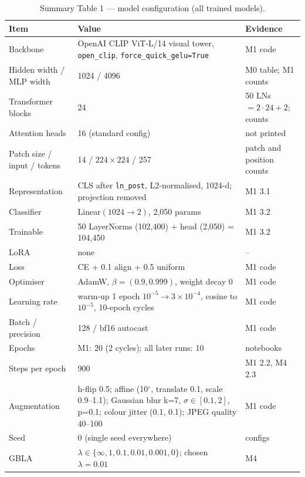 \documentclass[10pt,a4paper]{article}
\begin{document}
\begin{table}[H]\centering\small
\caption{Summary Table 1 --- model configuration (all trained models).}\label{tab:config}
\begin{tabularx}{\linewidth}{@{}L{4.6cm}YL{3.2cm}@{}}
\toprule
Item & Value & Evidence\\
\midrule
Backbone & OpenAI CLIP ViT-L/14 visual tower, \texttt{open\_clip}, \texttt{force\_quick\_gelu=True} & M1 code\\
Hidden width / MLP width & 1024 / 4096 & M0 table; M1 counts\\
Transformer blocks & 24 & 50 LNs \(=2\cdot24+2\); counts\\
Attention heads & 16 (standard config) & not printed\\
Patch size / input / tokens & 14 / \(224\times224\) / 257 & patch and position counts\\
Representation & CLS after \texttt{ln\_post}, L2-normalised, 1024-d; projection removed & M1 3.1\\
Classifier & Linear\((1024\to2)\), 2,050 params & M1 3.2\\
Trainable & 50 LayerNorms (102,400) + head (2,050) = 104,450 & M1 3.2\\
LoRA & none & --\\
Loss & CE + 0.1 align + 0.5 uniform & M1 code\\
Optimiser & AdamW, \(\beta=(0.9,0.999)\), weight decay 0 & M1 code\\
Learning rate & warm-up 1 epoch \(10^{-5}\to3\times10^{-4}\), cosine to \(10^{-5}\), 10-epoch cycles & M1 code\\
Batch / precision & 128 / bf16 autocast & M1 code\\
Epochs & M1: 20 (2 cycles); all later runs: 10 & notebooks\\
Steps per epoch & 900 & M1 2.2, M4 2.3\\
Augmentation & h-flip 0.5; affine (10\(^\circ\), translate 0.1, scale 0.9--1.1); Gaussian blur k=7, \(\sigma\in[0.1,2]\), p=0.1; colour jitter (0.1, 0.1); JPEG quality 40--100 & M1 code\\
Seed & 0 (single seed everywhere) & configs\\
GBLA & \(\lambda\in\{\infty,1,0.1,0.01,0.001,0\}\); chosen \(\lambda=0.01\) & M4\\
\bottomrule
\end{tabularx}
\end{table}
\end{document}
